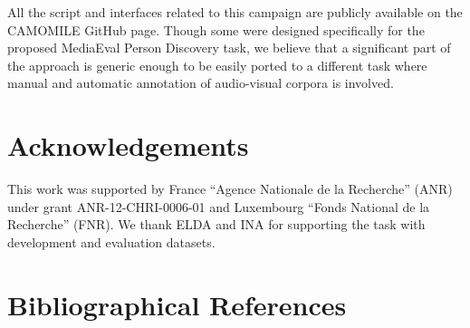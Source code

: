 \documentclass[10pt, a4paper]{article}
\begin{document}
All the script and interfaces related to this campaign are publicly available
on the CAMOMILE GitHub page. Though some were designed specifically for the
proposed MediaEval Person Discovery task, we believe that a significant part of
the approach is generic enough to be easily ported to a different task
where manual and automatic annotation of audio-visual corpora is involved.

\section{Acknowledgements}

This work was supported by France ``Agence Nationale de la Recherche''
(ANR) under grant ANR-12-CHRI-0006-01 and Luxembourg ``Fonds National de la
Recherche'' (FNR). We thank ELDA and INA for supporting the task with
development and evaluation datasets.


\section{Bibliographical References}
\label{main:ref}



\end{document}
